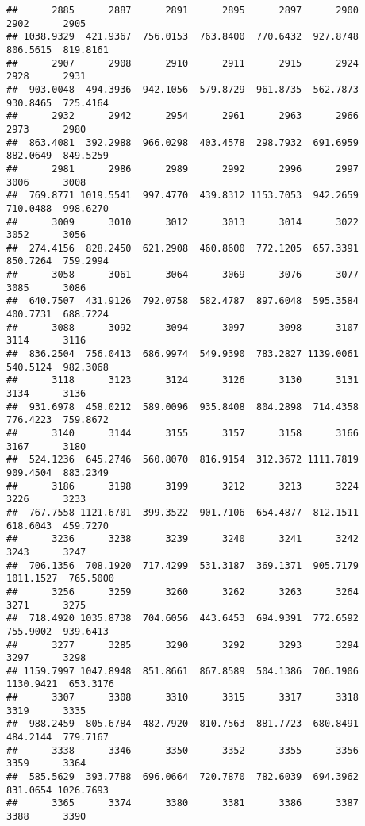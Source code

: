 \documentclass[
]{article}
\begin{document}
\begin{verbatim}
##      2885      2887      2891      2895      2897      2900      2902      2905 
## 1038.9329  421.9367  756.0153  763.8400  770.6432  927.8748  806.5615  819.8161 
##      2907      2908      2910      2911      2915      2924      2928      2931 
##  903.0048  494.3936  942.1056  579.8729  961.8735  562.7873  930.8465  725.4164 
##      2932      2942      2954      2961      2963      2966      2973      2980 
##  863.4081  392.2988  966.0298  403.4578  298.7932  691.6959  882.0649  849.5259 
##      2981      2986      2989      2992      2996      2997      3006      3008 
##  769.8771 1019.5541  997.4770  439.8312 1153.7053  942.2659  710.0488  998.6270 
##      3009      3010      3012      3013      3014      3022      3052      3056 
##  274.4156  828.2450  621.2908  460.8600  772.1205  657.3391  850.7264  759.2994 
##      3058      3061      3064      3069      3076      3077      3085      3086 
##  640.7507  431.9126  792.0758  582.4787  897.6048  595.3584  400.7731  688.7224 
##      3088      3092      3094      3097      3098      3107      3114      3116 
##  836.2504  756.0413  686.9974  549.9390  783.2827 1139.0061  540.5124  982.3068 
##      3118      3123      3124      3126      3130      3131      3134      3136 
##  931.6978  458.0212  589.0096  935.8408  804.2898  714.4358  776.4223  759.8672 
##      3140      3144      3155      3157      3158      3166      3167      3180 
##  524.1236  645.2746  560.8070  816.9154  312.3672 1111.7819  909.4504  883.2349 
##      3186      3198      3199      3212      3213      3224      3226      3233 
##  767.7558 1121.6701  399.3522  901.7106  654.4877  812.1511  618.6043  459.7270 
##      3236      3238      3239      3240      3241      3242      3243      3247 
##  706.1356  708.1920  717.4299  531.3187  369.1371  905.7179 1011.1527  765.5000 
##      3256      3259      3260      3262      3263      3264      3271      3275 
##  718.4920 1035.8738  704.6056  443.6453  694.9391  772.6592  755.9002  939.6413 
##      3277      3285      3290      3292      3293      3294      3297      3298 
## 1159.7997 1047.8948  851.8661  867.8589  504.1386  706.1906 1130.9421  653.3176 
##      3307      3308      3310      3315      3317      3318      3319      3335 
##  988.2459  805.6784  482.7920  810.7563  881.7723  680.8491  484.2144  779.7167 
##      3338      3346      3350      3352      3355      3356      3359      3364 
##  585.5629  393.7788  696.0664  720.7870  782.6039  694.3962  831.0654 1026.7693 
##      3365      3374      3380      3381      3386      3387      3388      3390 

\end{verbatim}
\end{document}
